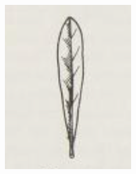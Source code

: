 \documentclass[12pt,english]{article}
\begin{document}
\begin{figure}[!hbt]
\begin{centre}
\begin{minipage}{0.19\textwidth}
		\includegraphics[width=\textwidth]{../code/contour/original/oblanceolate}
	\end{minipage}
\end{centre}
\end{figure}
\end{document}

